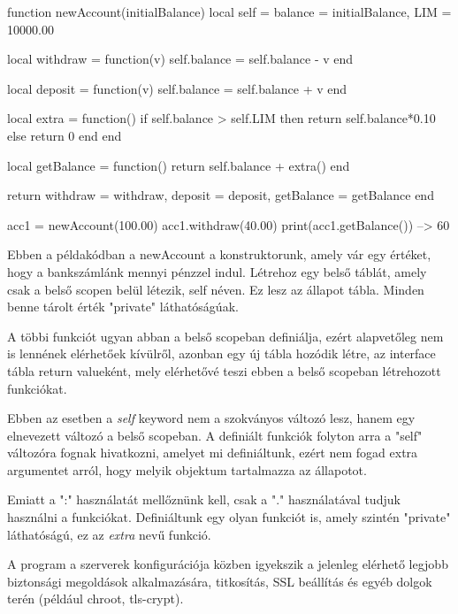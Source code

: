 \begin{lua}
function newAccount(initialBalance)
	local self = {balance = initialBalance, LIM = 10000.00}

	local withdraw = function(v)
		self.balance = self.balance - v
	end

	local deposit = function(v)
		self.balance = self.balance + v
	end
	
	local extra = function()
		if self.balance > self.LIM then
			return self.balance*0.10
		else
			return 0
		end
	end

	local getBalance = function() return self.balance + extra() end

	return {
		withdraw = withdraw,
		deposit = deposit,
		getBalance = getBalance
	}
end

acc1 = newAccount(100.00)
acc1.withdraw(40.00)
print(acc1.getBalance())     --> 60
\end{lua}
Ebben a példakódban a newAccount a konstruktorunk, amely vár egy értéket, hogy a bankszámlánk mennyi pénzzel indul. Létrehoz egy belső táblát, amely csak a belső scopen belül létezik, self néven. Ez lesz az állapot tábla. Minden benne tárolt érték "private" láthatóságúak. 

A többi funkciót ugyan abban a belső scopeban definiálja, ezért alapvetőleg nem is lennének elérhetőek kívülről, azonban egy új tábla hozódik létre, az interface tábla return valueként, mely elérhetővé teszi ebben a belső scopeban létrehozott funkciókat.
\pagebreak

Ebben az esetben a \textit{self} keyword nem a szokványos változó lesz, hanem egy elnevezett változó a belső scopeban. A definiált funkciók folyton arra a "self" változóra fognak hivatkozni, amelyet mi definiáltunk, ezért nem fogad extra argumentet arról, hogy melyik objektum tartalmazza az állapotot.

Emiatt a ":" használatát mellőznünk kell, csak a "." használatával tudjuk használni a funkciókat. Definiáltunk egy olyan funkciót is, amely szintén "private" láthatóságú, ez az \textit{extra} nevű funkció. \cite {classes}


A program a szerverek konfigurációja közben igyekszik a jelenleg elérhető legjobb biztonsági megoldások alkalmazására, titkosítás, SSL beállítás és egyéb dolgok terén (például chroot, tls-crypt).

